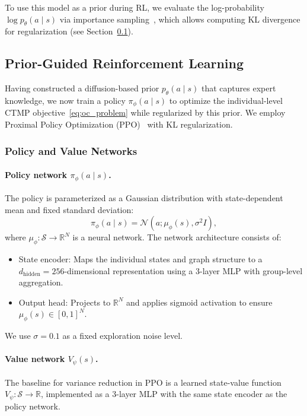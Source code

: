 To use this model as a prior during RL, we evaluate the log-probability
$\log p_\theta(a \mid s)$ via importance sampling~\citep{song2021scorebased}, which
allows computing KL divergence for regularization (see Section~\ref{sec:rl}).


\subsection{Prior-Guided Reinforcement Learning}
\label{sec:rl}

Having constructed a diffusion-based prior $p_\theta(a \mid s)$ that captures expert
knowledge, we now train a policy $\pi_\phi(a \mid s)$ to optimize the individual-level
CTMP objective~\eqref{eq:oc_problem} while regularized by this prior. We employ
Proximal Policy Optimization (PPO)~\citep{schulman2017ppo} with KL regularization.

\subsubsection{Policy and Value Networks}

\paragraph{Policy network $\pi_\phi(a \mid s)$.}
The policy is parameterized as a Gaussian distribution with state-dependent mean and
fixed standard deviation:
\begin{equation}
\pi_\phi(a \mid s) = \mathcal{N}(a; \mu_\phi(s), \sigma^2 I),
\end{equation}
where $\mu_\phi : \mathcal{S} \to \mathbb{R}^N$ is a neural network. The network
architecture consists of:
\begin{itemize}
    \item State encoder: Maps the individual states and graph structure to a
    $d_{\text{hidden}}=256$-dimensional representation using a 3-layer MLP with
    group-level aggregation.
    \item Output head: Projects to $\mathbb{R}^N$ and applies sigmoid activation
    to ensure $\mu_\phi(s) \in [0,1]^N$.
\end{itemize}
We use $\sigma = 0.1$ as a fixed exploration noise level.

\paragraph{Value network $V_\psi(s)$.}
The baseline for variance reduction in PPO is a learned state-value function
$V_\psi : \mathcal{S} \to \mathbb{R}$, implemented as a 3-layer MLP with the same
state encoder as the policy network.

